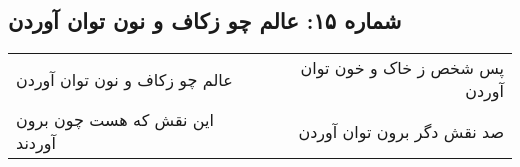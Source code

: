 \begin{center}
\section*{شماره ۱۵: عالم چو زکاف و نون توان آوردن}
\label{sec:015}
\begin{longtable}{l p{0.5cm} r}
عالم چو زکاف و نون توان آوردن
&&
پس شخص ز خاک و خون توان آوردن
\\
این نقش که هست چون برون آوردند
&&
صد نقش دگر برون توان آوردن
\\
\end{longtable}
\end{center}
